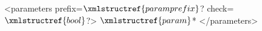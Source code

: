 <parameters prefix=$\xmlstructref{paramprefix}$? check=$\xmlstructref{bool}$?>
 $\xmlstructref{param}$*
</parameters>
